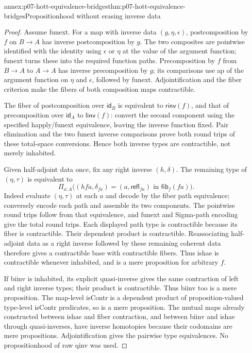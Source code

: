 \begin{annexitem}{annex:p07-hott-equivalence-bridges}{thm:p07-hott-equivalence-bridges}{Propositionhood without erasing inverse data}
\begin{proof}
Assume funext. For a map with inverse data $(g,\eta,\epsilon)$,
postcomposition by $f$ on $B\to A$ has inverse postcomposition by
$g$. The two composites are pointwise identified with the identity
using $\epsilon$ or $\eta$ at the value of the argument function;
funext turns these into the required function paths. Precomposition
by $f$ from $B\to A$ to $A\to A$ has inverse precomposition by $g$;
its comparisons use ap of the argument function on $\eta$ and
$\epsilon$, followed by funext. Adjointification and the fiber
criterion make the fibers of both composition maps contractible.

The fiber of postcomposition over $\mathsf{id}_B$ is equivalent to
$\mathsf{rinv}(f)$, and that of precomposition over $\mathsf{id}_A$
to $\mathsf{linv}(f)$: convert the second component using the specified
happly/funext equivalence, leaving the inverse function fixed.
Pair elimination and the two funext inverse comparisons prove both
round trips of these total-space conversions. Hence both inverse
types are contractible, not merely inhabited.

Given half-adjoint data once, fix any right inverse $(h,\delta)$.
The remaining type of $(\eta,\tau)$ is equivalent to
\[
 \Pi_{a:A}\big((h f a,\delta_{f a})=(a,\mathsf{refl}_{f a})
                                  \text{ in }\mathsf{fib}_f(f a)\big).
\]
Indeed evaluate $(\eta,\tau)$ at each $a$ and decode by the fiber
path equivalence; conversely encode each path and assemble its two
components. The pointwise round trips follow from that equivalence,
and funext and Sigma-path encoding give the total round trips.
Each displayed path type is contractible because its fiber is
contractible. Their dependent product is contractible. Reassociating
half-adjoint data as a right inverse followed by these remaining
coherent data therefore gives a contractible base with contractible
fibers. Thus ishae is contractible whenever inhabited, and is a
mere proposition for arbitrary $f$.

If biinv is inhabited, its explicit quasi-inverse gives the same
contraction of left and right inverse types; their product is
contractible. Thus biinv too is a mere proposition. The map-level
isContr is a dependent product of proposition-valued type-level
isContr predicates, so is a mere proposition. The mutual maps already
constructed between ishae and fiber contraction, and between biinv
and ishae through quasi-inverses, have inverse homotopies because
their codomains are mere propositions. Adjointification gives the
pairwise type equivalences. No propositionhood of raw qinv was used.


\end{proof}
\end{annexitem}
